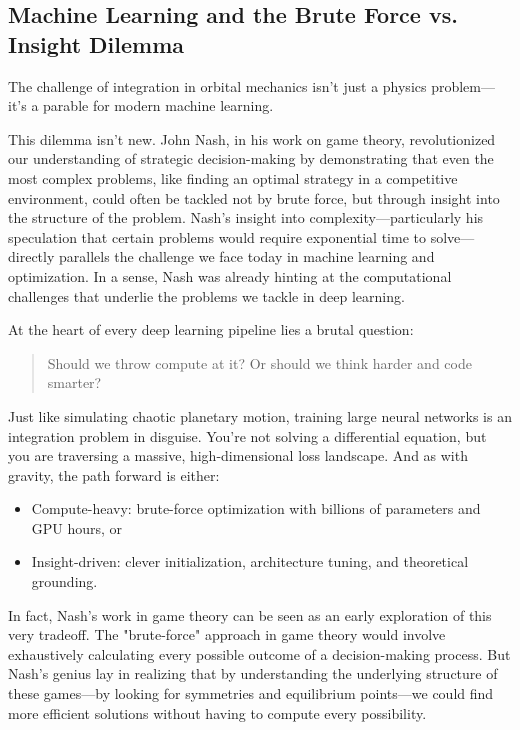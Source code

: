 \subsection{Machine Learning and the Brute Force vs. Insight Dilemma}

The challenge of integration in orbital mechanics isn’t just a physics problem—it’s a parable for modern machine learning.

This dilemma isn’t new. John Nash, in his work on game theory, revolutionized our understanding of strategic decision-making by demonstrating that even the most complex problems, like finding an optimal strategy in a competitive environment, could often be tackled not by brute force, but through insight into the structure of the problem. Nash's insight into complexity—particularly his speculation that certain problems would require exponential time to solve—directly parallels the challenge we face today in machine learning and optimization. In a sense, Nash was already hinting at the computational challenges that underlie the problems we tackle in deep learning.

At the heart of every deep learning pipeline lies a brutal question:

\begin{quote} Should we throw compute at it? Or should we think harder and code smarter? \end{quote}

Just like simulating chaotic planetary motion, training large neural networks is an integration problem in disguise. You’re not solving a differential equation, but you are traversing a massive, high-dimensional loss landscape. And as with gravity, the path forward is either:

\begin{itemize} 
	\item Compute-heavy: brute-force optimization with billions of parameters and GPU hours, or 
	\item Insight-driven: clever initialization, architecture tuning, and theoretical grounding. 
\end{itemize}

In fact, Nash’s work in game theory can be seen as an early exploration of this very tradeoff. The "brute-force" approach in game theory would involve exhaustively calculating every possible outcome of a decision-making process. But Nash’s genius lay in realizing that by understanding the underlying structure of these games—by looking for symmetries and equilibrium points—we could find more efficient solutions without having to compute every possibility.

